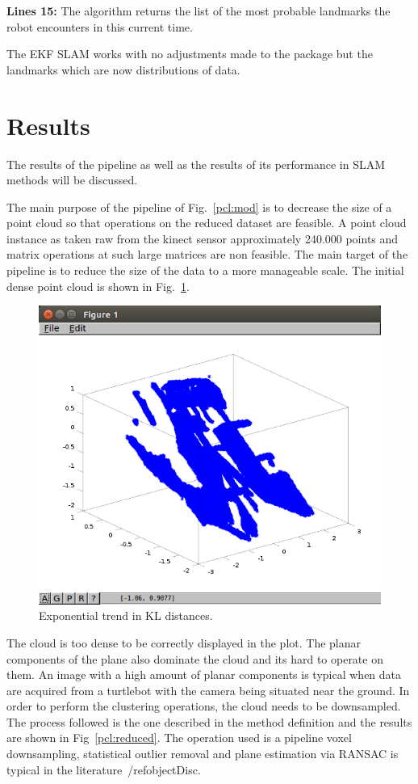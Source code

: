 \documentclass[twoside,hidelinks]{article}
\begin{document}
\textbf{Lines 15:} The algorithm returns the list of the most probable landmarks the robot encounters in this current time.


The EKF SLAM works with no adjustments made to the package but the landmarks which are now distributions of data.

\section{Results}
\label{sec:results}

The results of the pipeline as well as the results of its performance in SLAM methods will be discussed.

The main purpose of the pipeline of Fig.~\ref{pcl:mod} is to decrease the size of a point cloud so that operations on the reduced dataset are feasible. A point cloud instance as taken raw from the kinect sensor approximately 240.000 points and matrix operations at such large matrices are non feasible. The main target of the pipeline is to reduce the size of the data to a more manageable scale. The initial dense point cloud is shown in Fig.~\ref{pcl:fig}.

\begin{figure}[h!]
  \centering
    \includegraphics[width=.5\textwidth]{denseInitial}
    \caption{Exponential trend in KL distances.}
  \label{pcl:fig}
\end{figure}

The cloud is too dense to be correctly displayed in the plot. The planar components of the plane also dominate the cloud and its hard to operate on them. An image with a high amount of planar components is typical when data are acquired from a turtlebot with the camera being situated near the ground. In order to perform the clustering operations, the cloud needs to be downsampled. The process followed is the one described in the method definition and the results are shown in Fig~\ref{pcl:reduced}. The operation used is a pipeline voxel downsampling, statistical outlier removal and plane estimation via RANSAC is typical in the literature~/ref{objectDisc}.
\end{document}

